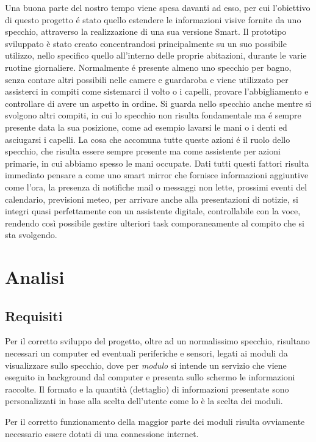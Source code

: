 \documentclass[12pt,a4paper]{article}
\begin{document}
Una buona parte del nostro tempo viene spesa davanti ad esso, per cui l'obiettivo
di questo progetto \'e stato quello estendere le informazioni visive fornite da uno
specchio, attraverso la realizzazione di una sua versione Smart. Il prototipo sviluppato
\`e stato creato concentrandosi principalmente su un suo possibile utilizzo, nello
specifico quello all'interno delle proprie abitazioni, durante le varie ruotine
giornaliere. Normalmente \'e presente almeno uno specchio per bagno, senza contare
altri possibili nelle camere e guardaroba e viene utilizzato per assisterci in compiti
come sistemarci il volto o i capelli, provare l'abbigliamento e controllare di avere un
aspetto in ordine. Si guarda nello specchio anche mentre si svolgono altri compiti, in cui
lo specchio non risulta fondamentale ma \'e sempre presente data la sua posizione, come
ad esempio lavarsi le mani o i denti ed asciugarsi i capelli. La cosa che accomuna tutte
queste azioni \'e il ruolo dello specchio, che risulta essere sempre presente ma come 
assistente per azioni primarie, in cui abbiamo spesso le mani occupate. Dati tutti questi
fattori risulta immediato pensare a come uno smart mirror che fornisce informazioni aggiuntive
come l'ora, la presenza di notifiche mail o messaggi non lette, prossimi eventi del calendario,
previsioni meteo, per arrivare anche alla presentazioni di notizie, si integri quasi perfettamente
con un assistente digitale, controllabile con la voce, rendendo cos\`i possibile gestire
ulteriori task comporaneamente al compito che si sta svolgendo.

\section{Analisi}

\subsection{Requisiti}

Per il corretto sviluppo del progetto, oltre ad un normalissimo specchio, risultano necessari un computer
ed eventuali periferiche e sensori, legati ai moduli da visualizzare sullo specchio, dove per \textit{modulo}
si intende un servizio che viene eseguito in background dal computer e presenta sullo schermo le informazioni
raccolte. Il formato e la quantit\`a (dettaglio) di informazioni presentate sono personalizzati in base alla
scelta dell'utente come lo \`e la scelta dei moduli.

Per il corretto funzionamento della maggior parte dei moduli risulta ovviamente necessario essere dotati di una
connessione internet.
\end{document}
